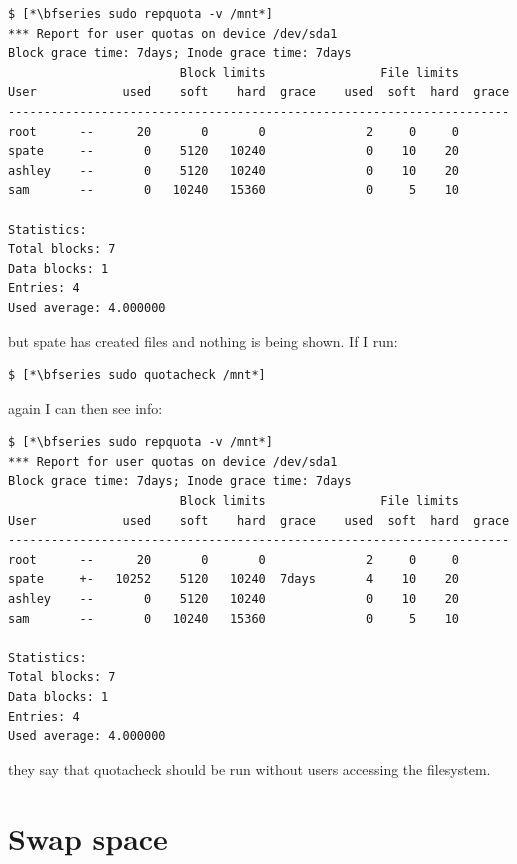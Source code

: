 \begin{lstlisting}
$ [*\bfseries sudo repquota -v /mnt*]
*** Report for user quotas on device /dev/sda1
Block grace time: 7days; Inode grace time: 7days
                        Block limits                File limits
User            used    soft    hard  grace    used  soft  hard  grace
----------------------------------------------------------------------
root      --      20       0       0              2     0     0       
spate     --       0    5120   10240              0    10    20       
ashley    --       0    5120   10240              0    10    20       
sam       --       0   10240   15360              0     5    10       

Statistics:
Total blocks: 7
Data blocks: 1
Entries: 4
Used average: 4.000000
\end{lstlisting}

\noindent 
but spate has created files and nothing is being shown. If I run:

\begin{lstlisting}
$ [*\bfseries sudo quotacheck /mnt*]
\end{lstlisting}

\noindent 
again I can then see info:

\begin{lstlisting}
$ [*\bfseries sudo repquota -v /mnt*]
*** Report for user quotas on device /dev/sda1
Block grace time: 7days; Inode grace time: 7days
                        Block limits                File limits
User            used    soft    hard  grace    used  soft  hard  grace
----------------------------------------------------------------------
root      --      20       0       0              2     0     0       
spate     +-   10252    5120   10240  7days       4    10    20       
ashley    --       0    5120   10240              0    10    20       
sam       --       0   10240   15360              0     5    10       

Statistics:
Total blocks: 7
Data blocks: 1
Entries: 4
Used average: 4.000000
\end{lstlisting}

\noindent 
they say that quotacheck should be run without users accessing the filesystem.



\section{Swap space}\label{swap}

